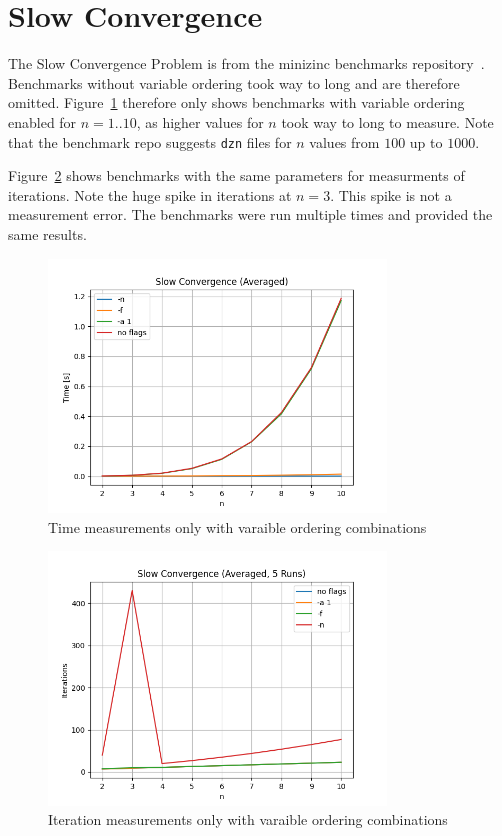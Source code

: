 \section{Slow Convergence}

The Slow Convergence Problem is from the minizinc benchmarks repository~\cite{minizinc_slow:2018}. Benchmarks without variable ordering took way to long and are therefore omitted. Figure~\ref{fig:slow:time_small} therefore only shows benchmarks with variable ordering enabled for $n=1..10$, as higher values for $n$ took way to long to measure. Note that the benchmark repo suggests \verb|dzn| files for $n$ values from $100$ up to $1000$.

Figure~\ref{fig:slow:iterations_small} shows benchmarks with the same parameters for measurments of iterations. Note the huge spike in iterations at $n = 3$. This spike is not a measurement error. The benchmarks were run multiple times and provided the same results.

\begin{figure}[ht]
	\centering
	\includegraphics[width=0.8\textwidth]{./Problems/slow_convergence/plots/time_small.png}
	\caption{Time measurements only with varaible ordering combinations}
	\label{fig:slow:time_small}
\end{figure}

\begin{figure}[ht]
	\centering
	\includegraphics[width=0.8\textwidth]{./Problems/slow_convergence/plots/iterations_small.png}
	\caption{Iteration measurements only with varaible ordering combinations}
	\label{fig:slow:iterations_small}
\end{figure}

